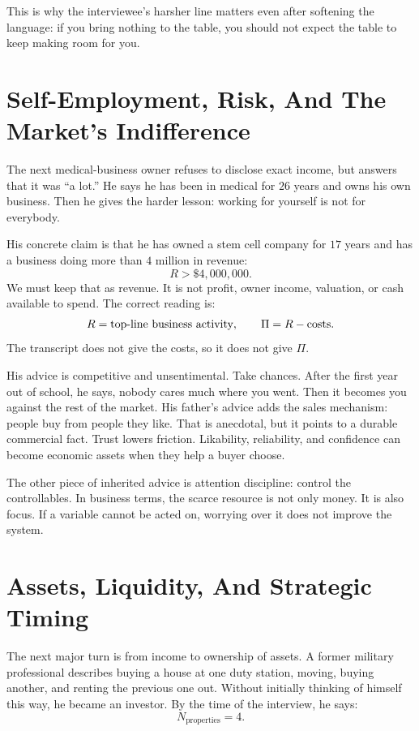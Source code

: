This is why the interviewee's harsher line matters even after softening the language: if you bring nothing to the table, you should not expect the table to keep making room for you.

\section{Self-Employment, Risk, And The Market's Indifference}

The next medical-business owner refuses to disclose exact income, but answers that it was ``a lot.'' He says he has been in medical for \(26\) years and owns his own business. Then he gives the harder lesson: working for yourself is not for everybody.

His concrete claim is that he has owned a stem cell company for \(17\) years and has a business doing more than \(4\) million in revenue:
\begin{equation}
R > \$4{,}000{,}000.
\end{equation}
We must keep that as revenue. It is not profit, owner income, valuation, or cash available to spend. The correct reading is:
\begin{equation}
R = \hbox{top-line business activity},
\qquad
\Pi = R - \hbox{costs}.
\end{equation}
The transcript does not give the costs, so it does not give \(\Pi\).

His advice is competitive and unsentimental. Take chances. After the first year out of school, he says, nobody cares much where you went. Then it becomes you against the rest of the market. His father's advice adds the sales mechanism: people buy from people they like. That is anecdotal, but it points to a durable commercial fact. Trust lowers friction. Likability, reliability, and confidence can become economic assets when they help a buyer choose.

The other piece of inherited advice is attention discipline: control the controllables. In business terms, the scarce resource is not only money. It is also focus. If a variable cannot be acted on, worrying over it does not improve the system.

\section{Assets, Liquidity, And Strategic Timing}

The next major turn is from income to ownership of assets. A former military professional describes buying a house at one duty station, moving, buying another, and renting the previous one out. Without initially thinking of himself this way, he became an investor. By the time of the interview, he says:
\begin{equation}
N_{\mathrm{properties}} = 4.
\end{equation}

